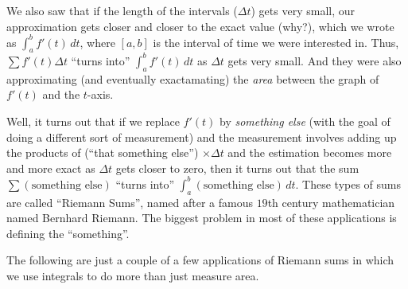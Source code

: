 \documentclass{ximera}
\begin{document}
We also saw that if the length of the intervals ($\Delta t$) gets very small, our approximation gets closer and closer to the exact value (why?), which we wrote as  $\int_a^b f'(t) \, dt$, where $[a, b]$ is the interval of time we were interested in.  Thus, $\sum f'(t) \Delta t$  ``turns into'' $\int_a^b f'(t)\, dt$  as $\Delta t$ gets very small.  And they were also approximating (and eventually exactamating) the {\em area} between the graph of $f'(t)$ and the $t$-axis.  

Well, it turns out that if we replace $f'(t)$ by {\em something else} (with the goal of doing a different sort of measurement) and the measurement involves adding up the products of (``that something else'') $\times \Delta t$  and the estimation becomes more and more exact as $\Delta t$ gets closer to zero, then it turns out that the sum  $\sum (\text{something else})$ ``turns into''  $\int_a^b (\text{something else})\, dt$.  These types of sums are called ``Riemann Sums'', named after a famous $19$th century mathematician named Bernhard Riemann.  The biggest problem in most of these applications is defining the ``something''.

The following are just a couple of a few applications of Riemann sums in which we use integrals to do more than just measure area.
\end{document}
